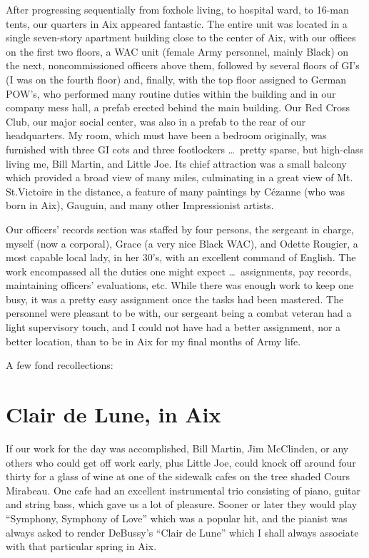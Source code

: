 \documentclass[../m3y]{subfiles}
\begin{document}
After progressing sequentially from foxhole living, to hospital ward, to 16-man tents, our quarters in Aix appeared fantastic. The entire unit was located in a single seven-story apartment building close to the center of Aix, with our offices on the first two floors, a WAC unit (female Army personnel, mainly Black) on the next, noncommissioned officers above them, followed by several floors of GI's (I was on the fourth floor) and, finally, with the top floor assigned to German POW's, who performed many routine duties within the building and in our company mess hall, a prefab erected behind the main building. Our Red Cross Club, our major social center, was also in a prefab to the rear of our headquarters. My room, which must have been a bedroom originally, was furnished with three GI cots and three footlockers \ldots\ pretty sparse, but high-class living me, Bill Martin, and Little Joe. Its chief attraction was a small balcony which provided a broad view of many miles, culminating in a great view of Mt. St.\@ Victoire in the distance, a feature of many paintings by C\'ezanne (who was born in Aix), Gauguin, and many other Impressionist artists.

Our officers' records section was staffed by four persons, the sergeant in charge, myself (now a corporal), Grace (a very nice Black WAC), and Odette Rougier, a most capable local lady, in her 30's, with an excellent command of English. The work encompassed all the duties one might expect \ldots\ assignments, pay records, maintaining officers' evaluations, etc\@. While there was enough work to keep one busy, it was a pretty easy assignment once the tasks had been mastered. The personnel were pleasant to be with, our sergeant being a combat veteran had a light supervisory touch, and I could not have had a better assignment, nor a better location, than to be in Aix for my final months of Army life.

A few fond recollections:

\section{Clair de Lune, in Aix}
If our work for the day was accomplished, Bill Martin, Jim McClinden, or any others who could get off work early, plus Little Joe, could knock off around four thirty for a glass of wine at one of the sidewalk cafes on the tree shaded Cours Mirabeau. One cafe had an excellent instrumental trio consisting of piano, guitar and string bass, which gave us a lot of pleasure. Sooner or later they would play ``Symphony, Symphony of Love'' which was a popular hit, and the pianist was always asked to render DeBussy's ``Clair de Lune'' which I shall always associate with that particular spring in Aix.
\end{document}
